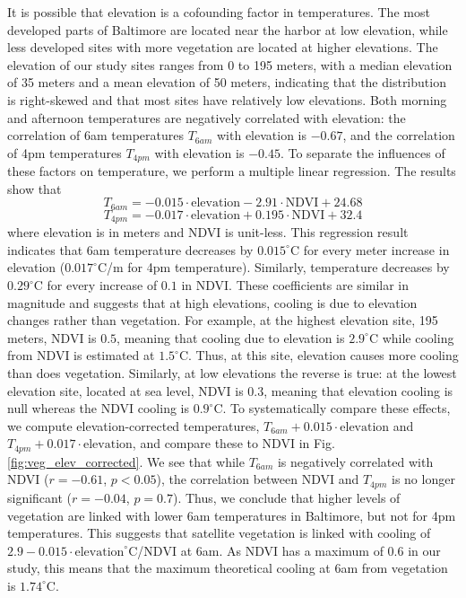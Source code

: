 \documentclass[draft,linenumbers]{agujournal}
\begin{document}
It is possible that elevation is a cofounding factor in temperatures. The most developed parts of Baltimore are located near the harbor at low elevation, while less developed sites with more vegetation are located at higher elevations. The elevation of our study sites ranges from 0 to 195 meters, with a median elevation of 35 meters and a mean elevation of 50 meters, indicating that the distribution is right-skewed and that most sites have relatively low elevations. Both morning and afternoon temperatures are negatively correlated with elevation: the correlation of 6am temperatures $T_{6am}$ with elevation is $-0.67$, and the correlation of 4pm temperatures $T_{4pm}$ with elevation is $-0.45$. To separate the influences of these factors on temperature, we perform a multiple linear regression. The results show that 
\[ T_{6am} = -0.015\cdot \text{elevation} -2.91 \cdot \text{NDVI} + 24.68\] 
\[ T_{4pm} = -0.017\cdot \text{elevation} +0.195 \cdot \text{NDVI} + 32.4\]
where elevation is in meters and NDVI is unit-less. 
This regression result indicates that 6am temperature decreases by $0.015^\circ$C for every meter increase in elevation ($0.017^\circ$C/m for 4pm temperature). Similarly, temperature decreases by $0.29^\circ$C for every increase of $0.1$ in NDVI. 
These coefficients are similar in magnitude and suggests that at high elevations, cooling is due to elevation changes rather than vegetation.
 For example, at the highest elevation site, 195 meters, NDVI is $0.5$, meaning that cooling due to elevation is $2.9^\circ$C while cooling from NDVI is estimated at $1.5^\circ$C. Thus, at this site, elevation causes more cooling than does vegetation. 
 Similarly, at low elevations the reverse is true: at the lowest elevation site, located at sea level, NDVI is $0.3$, meaning that elevation cooling is null whereas the NDVI cooling is  $0.9^\circ$C. 
To systematically compare these effects, 
we compute elevation-corrected temperatures, $T_{6am} + 0.015\cdot \text{elevation}$ and $T_{4pm} + 0.017\cdot \text{elevation}$, and compare these to NDVI in Fig.\ref{fig:veg_elev_corrected}. We see that while $T_{6am}$ is negatively correlated with NDVI ($r=-0.61$, $p<0.05$), the correlation between NDVI and $T_{4pm}$ is no longer significant ($r=-0.04$, $p=0.7$). 
Thus, we conclude that higher levels of vegetation are linked with lower 6am temperatures in Baltimore, but not for 4pm temperatures. This suggests that satellite vegetation is linked with cooling of $2.9 - 0.015\cdot \text{elevation} ^\circ$C/$\text{NDVI}$ at 6am. As NDVI has a maximum of $0.6$ in our study, this means that the maximum theoretical cooling at 6am from vegetation is $1.74^\circ$C. 
\end{document}
